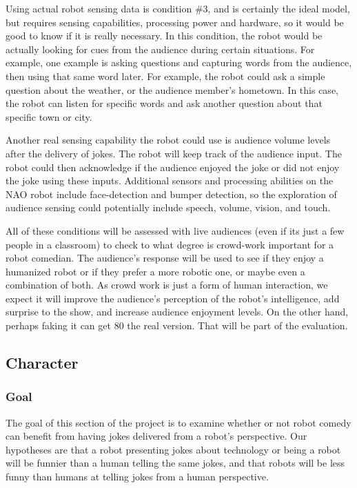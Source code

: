 Using actual robot sensing data is condition \#3, and is certainly the ideal model, but requires sensing capabilities,
processing power and hardware, so it would be good to know if it is really necessary. In this condition, the robot would
be actually looking for cues from the audience during certain situations. For example, one example is asking questions
and capturing words from the audience, then using that same word later. For example, the robot could ask a simple
question about the weather, or the audience member’s hometown. In this case, the robot can listen for specific words
and ask another question about that specific town or city.

Another real sensing capability the robot could use is audience volume levels after the delivery of jokes. The robot
will keep track of the audience input. The robot could then acknowledge if the audience enjoyed the joke or did not
enjoy the joke using these inputs. Additional sensors and processing abilities on the NAO robot include face-detection
and bumper detection, so the exploration of audience sensing could potentially include speech, volume, vision, and
touch.

All of these conditions will be assessed with live audiences (even if its just a few people in a classroom) to check to
what degree is crowd-work important for a robot comedian. The audience’s response will be used to see if they enjoy
a humanized robot or if they prefer a more robotic one, or maybe even a combination of both. As crowd work is just a
form of human interaction, we expect it will improve the audience’s perception of the robot’s intelligence, add surprise
to the show, and increase audience enjoyment levels. On the other hand, perhaps faking it can get 80%
the real version. That will be part of the evaluation.



\subsection{Character}
\subsubsection{Goal}
The goal of this section of the project is to examine whether or not robot comedy can benefit from having jokes delivered
from a robot’s perspective. Our hypotheses are that a robot presenting jokes about technology or being a robot will be
funnier than a human telling the same jokes, and that robots will be less funny than humans at telling jokes from a
human perspective.

